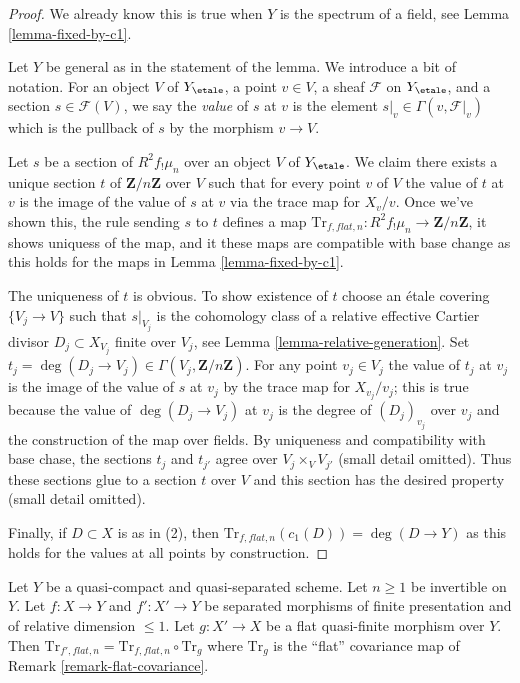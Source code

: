 \begin{proof}
We already know this is true when $Y$ is the spectrum of a field,
see Lemma \ref{lemma-fixed-by-c1}.

\medskip\noindent
Let $Y$ be general as in the statement of the lemma. We introduce
a bit of notation. For an object $V$ of $Y_\etale$, a point $v \in V$,
a sheaf $\mathcal{F}$ on $Y_\etale$, and a section $s \in \mathcal{F}(V)$,
we say the {\it value} of $s$ at $v$ is the element
$s|_v \in \Gamma(v, \mathcal{F}|_v)$ which is the pullback of
$s$ by the morphism $v \to V$.

\medskip\noindent
Let $s$ be a section of $R^2f_!\mu_n$ over an object $V$ of $Y_\etale$.
We claim there exists a unique section $t$ of $\mathbf{Z}/n\mathbf{Z}$
over $V$ such that for every point $v$ of $V$ the value of $t$ at $v$
is the image of the value of $s$ at $v$ via the trace map for $X_v/v$.
Once we've shown this, the rule sending $s$ to $t$ defines a map
$\text{Tr}_{f, \mathit{flat}, n} : R^2f_!\mu_n \to \mathbf{Z}/n\mathbf{Z}$,
it shows uniquess of the map, and it these maps are compatible
with base change as this holds for the maps in Lemma \ref{lemma-fixed-by-c1}.

\medskip\noindent
The uniqueness of $t$ is obvious. To show existence of $t$
choose an \'etale covering $\{V_j \to V\}$ such that $s|_{V_j}$
is the cohomology class of a relative effective Cartier divisor
$D_j \subset X_{V_j}$ finite over $V_j$, see
Lemma \ref{lemma-relative-generation}.
Set $t_j = \deg(D_j \to V_j) \in \Gamma(V_j, \mathbf{Z}/n\mathbf{Z})$.
For any point $v_j \in V_j$ the value of $t_j$ at $v_j$ is the
image of the value of $s$ at $v_j$ by the trace map for $X_{v_j}/v_j$;
this is true because the value of $\deg(D_j \to V_j)$ at $v_j$
is the degree of $(D_j)_{v_j}$ over $v_j$ and the construction
of the map over fields. By uniqueness and compatibility with base
chase, the sections $t_j$ and $t_{j'}$ agree over $V_j \times_V V_{j'}$
(small detail omitted).
Thus these sections glue to a section $t$ over $V$
and this section has the desired property (small detail omitted).

\medskip\noindent
Finally, if $D \subset X$ is as in (2), then
$\text{Tr}_{f, \mathit{flat}, n}(c_1(D)) = \deg(D \to Y)$
as this holds for the values at all points by construction.
\end{proof}

\begin{lemma}
\label{lemma-flat-covariance-trace-relative-curve}
Let $Y$ be a quasi-compact and quasi-separated scheme.
Let $n \geq 1$ be invertible on $Y$. Let $f : X \to Y$
and $f' : X' \to Y$ be separated morphisms of finite presentation
and of relative dimension $\leq 1$. Let $g : X' \to X$
be a flat quasi-finite morphism over $Y$.
Then $\text{Tr}_{f', \mathit{flat}, n} =
\text{Tr}_{f, \mathit{flat}, n} \circ \text{Tr}_g$
where $\text{Tr}_g$ is the ``flat'' covariance map
of Remark \ref{remark-flat-covariance}.
\end{lemma}

